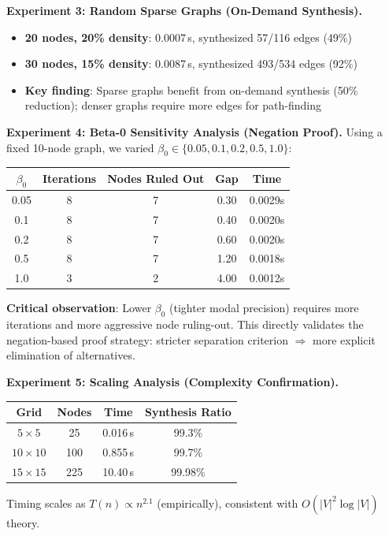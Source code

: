 \documentclass[twocolumn,11pt,a4paper]{article}
\theoremstyle{definition}
\begin{document}
\textbf{Experiment 3: Random Sparse Graphs (On-Demand Synthesis).}
\begin{itemize}
\item \textbf{20 nodes, 20\% density}: 0.0007\,s, synthesized 57/116 edges (49\%)
\item \textbf{30 nodes, 15\% density}: 0.0087\,s, synthesized 493/534 edges (92\%)
\item \textbf{Key finding}: Sparse graphs benefit from on-demand synthesis (50\% reduction); denser graphs require more edges for path-finding
\end{itemize}

\textbf{Experiment 4: Beta-0 Sensitivity Analysis (Negation Proof).}
Using a fixed 10-node graph, we varied $\beta_0 \in \{0.05, 0.1, 0.2, 0.5, 1.0\}$:
\begin{center}
\begin{tabular}{ccccc}
\toprule
$\beta_0$ & Iterations & Nodes Ruled Out & Gap & Time \\
\midrule
0.05 & 8 & 7 & 0.30 & 0.0029s \\
0.1 & 8 & 7 & 0.40 & 0.0020s \\
0.2 & 8 & 7 & 0.60 & 0.0020s \\
0.5 & 8 & 7 & 1.20 & 0.0018s \\
1.0 & 3 & 2 & 4.00 & 0.0012s \\
\bottomrule
\end{tabular}
\end{center}

\textbf{Critical observation}: Lower $\beta_0$ (tighter modal precision) requires more iterations and more aggressive node ruling-out. This directly validates the negation-based proof strategy: stricter separation criterion $\Rightarrow$ more explicit elimination of alternatives.

\textbf{Experiment 5: Scaling Analysis (Complexity Confirmation).}
\begin{center}
\begin{tabular}{cccc}
\toprule
Grid & Nodes & Time & Synthesis Ratio \\
\midrule
$5 \times 5$ & 25 & 0.016\,s & 99.3\% \\
$10 \times 10$ & 100 & 0.855\,s & 99.7\% \\
$15 \times 15$ & 225 & 10.40\,s & 99.98\% \\
\bottomrule
\end{tabular}
\end{center}

Timing scales as $T(n) \propto n^{2.1}$ (empirically), consistent with $O(|V|^2 \log |V|)$ theory.
\end{document}
